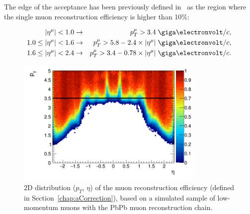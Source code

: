 The edge of the acceptance has been previously defined
in~\cite{torsten} as the region where the single muon reconstruction
efficiency is higher than 10\%:

\begin{eqnarray}
\vert\eta^{\mu}\vert < 1.0 & \to & \pt^{\mu} > 3.4 \;\GeVc,  \nonumber  \\
1.0 \leq \vert\eta^{\mu}\vert < 1.6 & \to & \pt^{\mu} > 5.8 - 2.4 \times \vert\eta^{\mu}\vert\; \GeVc,\\
1.6 \leq \vert\eta^{\mu}\vert < 2.4 & \to & \pt^{\mu} > 3.4 - 0.78  \nonumber 
\times \vert\eta^{\mu}\vert\; \GeVc.
\label{eq:acceptanceedge}
\end{eqnarray}

\begin{figure}[h]
\begin{center}
\includegraphics[width=  0.8\textwidth]{Chapters/aYield/smueff.png}
\caption{2D distribution ($p_{T}$, $\eta$) of the muon reconstruction
  efficiency (defined in Section~\ref{chap:aCorrection}), based on a simulated sample of low-momentum muons with
  the PbPb muon reconstruction chain.}
\label{fig:simpleacceptance}
\end{center}
\end{figure}

